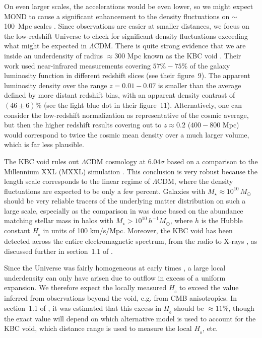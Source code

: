 \documentclass[fleqn,usenatbib,useAMS,onecolumn]{mnras} %
\begin{document}
On even larger scales, the accelerations would be even lower, so we might expect MOND to cause a significant enhancement to the density fluctuations on $\sim$100~Mpc scales \citep{Sanders_2001}. Since observations are easier at smaller distances, we focus on the low-redshift Universe to check for significant density fluctuations exceeding what might be expected in $\Lambda$CDM. There is quite strong evidence that we are inside an underdensity of radius $\approx 300$ Mpc known as the KBC void \citep*{Keenan_2013}. Their work used near-infrared measurements covering $57\%-75\%$ of the galaxy luminosity function in different redshift slices (see their figure~9). The apparent luminosity density over the range $z = 0.01-0.07$ is smaller than the average defined by more distant redshift bins, with an apparent density contrast of $\left( 46 \pm 6 \right)\%$ (see the light blue dot in their figure~11). Alternatively, one can consider the low-redshift normalization as representative of the cosmic average, but then the higher redshift results covering out to $z \approx 0.2$ ($400 - 800$ Mpc) would correspond to twice the cosmic mean density over a much larger volume, which is far less plausible.

The KBC void \citep[discussed also in][]{Wong_2022} rules out $\Lambda$CDM cosmology at $6.04 \sigma$ \citep{Haslbauer_2020} based on a comparison to the Millennium XXL (MXXL) simulation \citep{Angulo_2012}. This conclusion is very robust because the length scale corresponds to the linear regime of $\Lambda$CDM, where the density fluctuations are expected to be only a few percent. Galaxies with $M_{\star} \approx 10^{10} \, M_\odot$ should be very reliable tracers of the underlying matter distribution on such a large scale, especially as the comparison in \citet{Haslbauer_2020} was done based on the abundance matching \citep{Springel_2005, Angulo_2014} stellar mass in halos with $M_{\star} > 10^{10} \, h^{-1} M_\odot$, where $h$ is the Hubble constant $H_{_0}$ in units of 100 km/s/Mpc. Moreover, the KBC void has been detected across the entire electromagnetic spectrum, from the radio \citep{Rubart_2013} to X-rays \citep{Bohringer_2015, Bohringer_2020}, as discussed further in section~1.1 of \citet{Haslbauer_2020}.

Since the Universe was fairly homogeneous at early times \citep{Planck_2014_Doppler}, a large local underdensity can only have arisen due to outflow in excess of a uniform expansion. We therefore expect the locally measured $H_{_0}$ to exceed the value inferred from observations beyond the void, e.g. from CMB anisotropies. In section~1.1 of \citet{Haslbauer_2020}, it was estimated that this excess in $H_{_0}$ should be $\approx 11\%$, though the exact value will depend on which alternative model is used to account for the KBC void, which distance range is used to measure the local $H_{_0}$, etc.
\end{document}
